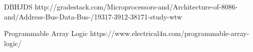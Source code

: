 \newpage
{}
    \begin{thebibliography}{9}

     DBHJDS
    http://gradestack.com/Microprocessors-and/Architecture-of-8086-and/Address-Bus-Data-Bus-/19317-3912-38171-study-wtw

     Programmable Array Logic
    https://www.electrical4u.com/programmable-array-logic/

    \end{thebibliography}
